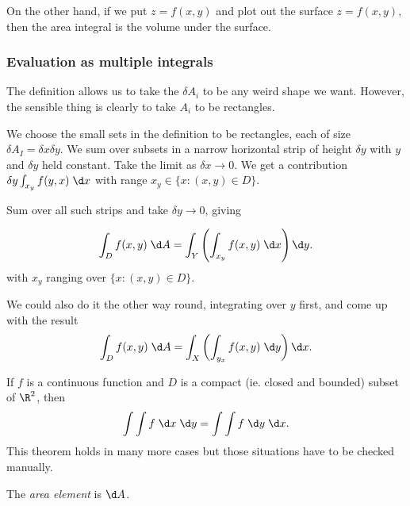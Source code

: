 \documentclass[a4paper]{article}
\begin{document}
On the other hand, if we put $z = f(x, y)$ and plot out the surface $z = f(x, y)$, then the area integral is the volume under the surface.
\subsubsection{Evaluation as multiple integrals}
The definition allows us to take the $\delta A_i$ to be any weird shape we want. However, the sensible thing is clearly to take $A_i$ to be rectangles.

We choose the small sets in the definition to be rectangles, each of size $\delta A_I = \delta x\delta y$. We sum over subsets in a narrow horizontal strip of height $\delta y$ with $y$ and $\delta y$ held constant. Take the limit as $\delta x\to 0$. We get a contribution $\delta y\int_{x_y} f(y, x)\;\d x$ with range $x_y\in \{x: (x, y)\in D\}$.

\begin{center}
\end{center}

Sum over all such strips and take $\delta y\to 0$, giving

\begin{prop}
  \[
    \int_D f(x, y)\;\d A = \int_Y\left(\int_{x_y}f(x, y)\;\d x\right) \d y.
  \]
  with $x_y$ ranging over $\{x: (x, y) \in D\}$.
\end{prop}

We could also do it the other way round, integrating over $y$ first, and come up with the result
\[
  \int_D f(x, y)\; \d A = \int_X\left(\int_{y_x}f(x, y)\; \d y\right) \d x.
\]
\begin{thm}
  If $f$ is a continuous function and $D$ is a compact (ie. closed and bounded) subset of $\R^2$, then
  \[
    \int\int f\;\d x\;\d y = \int\int f\;\d y\;\d x.
  \]
  This theorem holds in many more cases but those situations have to be checked manually.
\end{thm}
\begin{defi}
  The \emph{area element} is $\d A$.
\end{defi}
\end{document}
